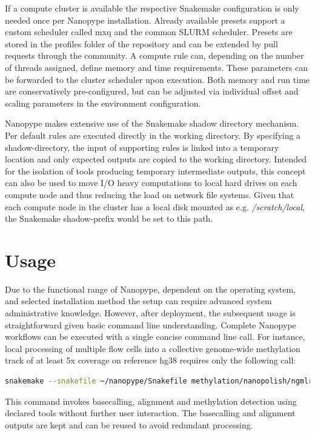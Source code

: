 If a compute cluster is available the respective Snakemake configuration is only needed once per Nanopype installation. Already available presets support a custom scheduler called mxq and the common SLURM scheduler. Presets are stored in the profiles folder of the repository and can be extended by pull requests through the community. A compute rule can, depending on the number of threads assigned, define memory and time requirements. These parameters can be forwarded to the cluster scheduler upon execution. Both memory and run time are conservatively pre-configured, but can be adjusted via individual offset and scaling parameters in the environment configuration. 

Nanopype makes extensive use of the Snakemake shadow directory mechanism. Per default rules are executed directly in the working directory. By specifying a shadow-directory, the input of supporting rules is linked into a temporary location and only expected outputs are copied to the working directory. Intended for the isolation of tools producing temporary intermediate outputs, this concept can also be used to move I/O heavy computations to local hard drives on each compute node and thus reducing the load on network file systems. Given that each compute node in the cluster has a local disk mounted as e.g. \textit{/scratch/local}, the Snakemake shadow-prefix would be set to this path.




\section{Usage}
\label{sec:nanopype:usage}
Due to the functional range of Nanopype, dependent on the operating system, and selected installation method the setup can require advanced system administrative knowledge. However, after deployment, the subsequent usage is straightforward given basic command line understanding. Complete Nanopype workflows can be executed with a single concise command line call. For instance, local processing of multiple flow cells into a collective genome-wide methylation track of at least 5x coverage on reference hg38 requires only the following call:

\begin{lstlisting}[language=sh, caption=Snakemake example]
snakemake --snakefile ~/nanopype/Snakefile methylation/nanopolish/ngmlr/guppy/Hues8.5x.hg38.bw
\end{lstlisting}

This command invokes basecalling, alignment and methylation detection using declared tools without further user interaction. The basecalling and alignment outputs are kept and can be reused to avoid redundant processing.


